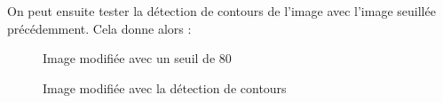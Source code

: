 \documentclass[french,a4paper,10pt]{article}
\begin{document}
	On peut ensuite tester la détection de contours de l'image avec l'image seuillée précédemment.
	Cela donne alors :
	\begin{figure}[!htb]
		\begin{minipage}{0.48\textwidth}
			\centering
			\caption{Image modifiée avec un seuil de 80}\label{Fig:test-grey-08-8}
		\end{minipage}\hfill
		\begin{minipage}{0.48\textwidth}
			\centering
			\caption{Image modifiée avec la détection de contours}\label{Fig:difference-test-grey-08}
		\end{minipage}
	\end{figure}
\end{document}
